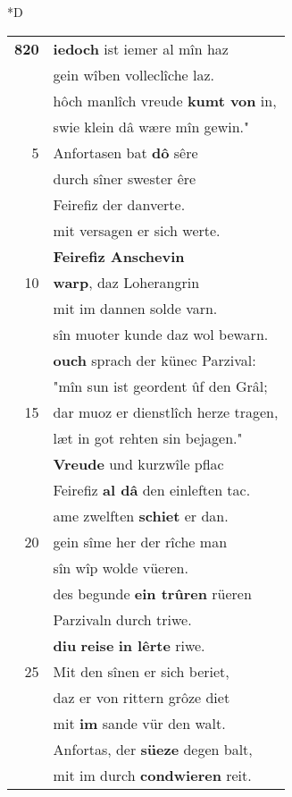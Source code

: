 \documentclass[8pt,a4paper,notitlepage]{article}
\begin{document}
\begin{table}[ht]
\begin{minipage}[t]{0.5\linewidth}
\small
\begin{center}*D
\end{center}
\begin{tabular}{rl}
\textbf{820} & \textbf{iedoch} ist iemer al mîn haz\\ 
 & gein wîben volleclîche laz.\\ 
 & hôch manlîch vreude \textbf{kumt von} in,\\ 
 & swie klein dâ wære mîn gewin."\\ 
5 & Anfortasen bat \textbf{dô} sêre\\ 
 & durch sîner swester êre\\ 
 & Feirefiz der danverte.\\ 
 & mit versagen er sich werte.\\ 
 & \textbf{Feirefiz Anschevin}\\ 
10 & \textbf{warp}, daz Loherangrin\\ 
 & mit im dannen solde varn.\\ 
 & sîn muoter kunde daz wol bewarn.\\ 
 & \textbf{ouch} sprach der künec Parzival:\\ 
 & "mîn sun ist geordent ûf den Grâl;\\ 
15 & dar muoz er dienstlîch herze tragen,\\ 
 & læt in got rehten sin bejagen."\\ 
 & \textbf{Vreude} und kurzwîle pflac\\ 
 & Feirefiz \textbf{al dâ} den einleften tac.\\ 
 & ame zwelften \textbf{schiet} er dan.\\ 
20 & gein sîme her der rîche man\\ 
 & sîn wîp wolde vüeren.\\ 
 & des begunde \textbf{ein trûren} rüeren\\ 
 & Parzivaln durch triwe.\\ 
 & \textbf{diu} \textbf{reise} \textbf{in lêrte} riwe.\\ 
25 & Mit den sînen er sich beriet,\\ 
 & daz er von rittern grôze diet\\ 
 & mit \textbf{im} sande vür den walt.\\ 
 & Anfortas, der \textbf{süeze} degen balt,\\ 
 & mit im durch \textbf{condwieren} reit.\\ 

\end{tabular}
\end{minipage}
\end{table}
\end{document}
